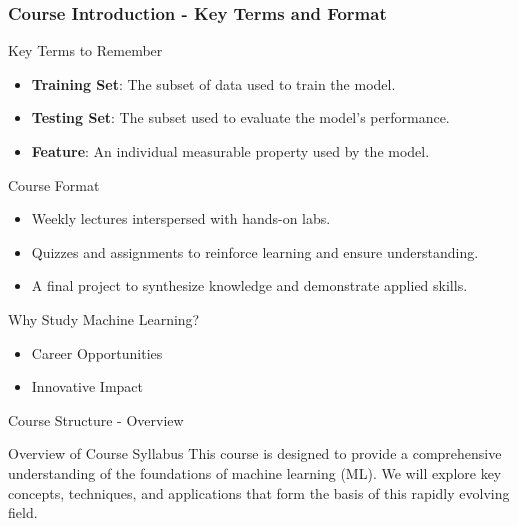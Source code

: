 \documentclass[aspectratio=169]{beamer}
\begin{document}
\begin{frame}[fragile]
    \frametitle{Course Introduction - Key Terms and Format}
    \begin{block}{Key Terms to Remember}
        \begin{itemize}
            \item \textbf{Training Set}: The subset of data used to train the model.
            \item \textbf{Testing Set}: The subset used to evaluate the model's performance.
            \item \textbf{Feature}: An individual measurable property used by the model.
        \end{itemize}
    \end{block}

    \begin{block}{Course Format}
        \begin{itemize}
            \item Weekly lectures interspersed with hands-on labs.
            \item Quizzes and assignments to reinforce learning and ensure understanding.
            \item A final project to synthesize knowledge and demonstrate applied skills.
        \end{itemize}
    \end{block}

    \begin{block}{Why Study Machine Learning?}
        \begin{itemize}
            \item Career Opportunities
            \item Innovative Impact
        \end{itemize}
    \end{block}
\end{frame}

\begin{frame}[fragile]{Course Structure - Overview}
    \begin{block}{Overview of Course Syllabus}
        This course is designed to provide a comprehensive understanding of the foundations of machine learning (ML). 
        We will explore key concepts, techniques, and applications that form the basis of this rapidly evolving field.
    \end{block}
\end{frame}
\end{document}
